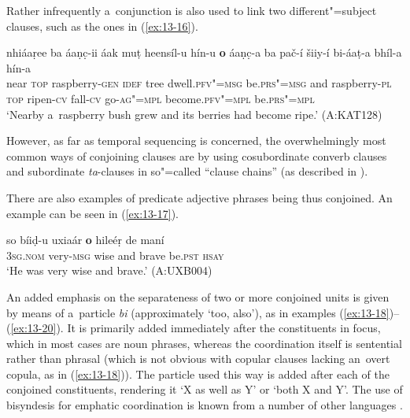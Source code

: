 Rather infrequently a~conjunction is also used to link two different"=subject clauses, such as the ones in (\ref{ex:13-16}).

\ea
\label{ex:13-16}
\gll nhiáaṛee ba {\ob}áaṇc̣-ii áak muṭ heensíl-u hín-u \textbf{o} áaṇc̣-a ba pač-í šiiy-í bi-áaṭ-a bhíl-a hín-a{\cb}\\
near \textsc{top} raspberry-\textsc{gen} \textsc{idef} tree dwell.\textsc{pfv"=msg}  be.\textsc{prs"=msg} and raspberry-\textsc{pl} \textsc{top} ripen-\textsc{cv} fall-\textsc{cv} go-\textsc{ag"=mpl} become.\textsc{pfv"=mpl} be.\textsc{prs"=mpl}\\
\glt `Nearby a~raspberry bush grew and its berries had become ripe.' (A:KAT128) 
\z

However, as far as temporal sequencing is concerned, the overwhelmingly most common ways of conjoining clauses are by using cosubordinate converb clauses and subordinate \textit{ta}-clauses in so"=called ``clause chains'' (as described in ).


There are also examples of predicate adjective phrases being thus conjoined. An example can be seen in (\ref{ex:13-17}).

\begin{exe}
\ex
\label{ex:13-17}
\gll so bíiḍ-u {\ob}uxiaár \textbf{o} hileéṛ{\cb} de maní  \\
\textsc{3sg.nom} very-\textsc{msg} wise and brave be.\textsc{pst} \textsc{hsay} \\
\glt `He was very wise and brave.' (A:UXB004) 
\end{exe}

 An added emphasis on the separateness of two or more conjoined units is given by means of a~particle \textit{bi} (approximately `too, also'), as in examples (\ref{ex:13-18})--(\ref{ex:13-20}). It is primarily added immediately after the constituents in focus, which in most cases are noun phrases, whereas the coordination itself is sentential rather than phrasal (which is not obvious with copular clauses lacking an~overt copula, as in (\ref{ex:13-18})). The particle used this way is added after each of the conjoined constituents, rendering it `X as well as Y' or `both X and Y'. The use of bisyndesis for emphatic coordination is known from a number of other languages \citep[15--17]{haspelmath2007}. 

